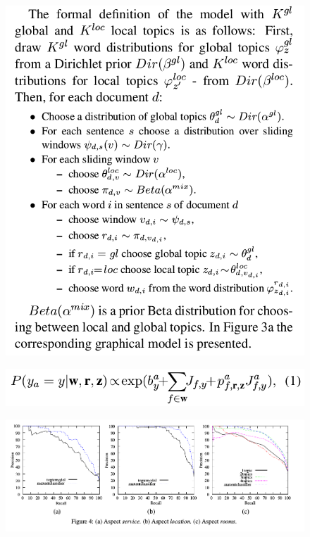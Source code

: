 \documentclass[xcolor={table}]{beamer}
\begin{document}
\begin{frame}{\cite{titov2008joint}}
\begin{figure}[h]
\centering
\includegraphics[scale=.3]{images/gen-titov08} \\
\end{figure}
\end{frame}


\begin{frame}{\cite{titov2008joint}}
\begin{figure}[h]
\centering
\includegraphics[scale=.3]{images/class-titov08} \\
\end{figure}
\end{frame}


\begin{frame}{\cite{titov2008joint}}
\begin{figure}[h]
\centering
\includegraphics[scale=.3]{images/figure4-titov08} \\
\end{figure}
\end{frame}
\end{document}

